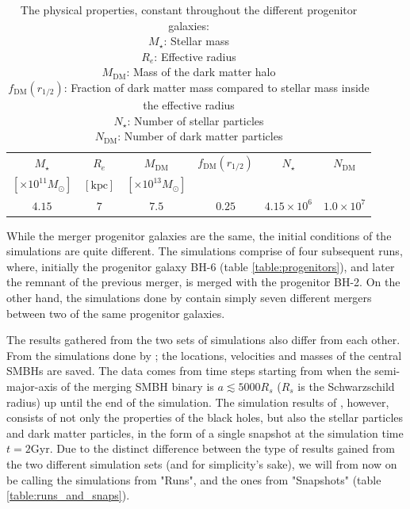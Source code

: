 \documentclass[english, oneside]{HYgradu}
\begin{document}
\begin{table}
	\begin{center}
		\begin{tabular}{c c c c c c}
		\hline
		\hline
		$M_\star$ & $R_e$ & $M_\mathrm{DM}$ & $f_\mathrm{DM}(r_{1/2})$ & $N_\star$ & $N_\mathrm{DM}$ \\
		$[\times 10^{11} M_\odot]$ & $[\mathrm{kpc}]$ & $[\times 10^{13} M_\odot]$ & & & \\
		\hline
		$4.15$ & $7$ & $7.5$ & $0.25$ & $4.15 \times 10^6$ & $1.0 \times 10^7$ \\
		\hline
		\end{tabular}
	\end{center}
	\caption{The physical properties, constant throughout the different progenitor galaxies: \\
	$M_\star$: Stellar mass \\
	$R_e$: Effective radius \\
	$M_\mathrm{DM}$: Mass of the dark matter halo \\
	$f_\mathrm{DM}(r_{1/2})$: Fraction of dark matter mass compared to stellar mass inside the effective radius \\
	$N_\star$: Number of stellar particles \\
	$N_\mathrm{DM}$: Number of dark matter particles}
	\label{table:properties}
\end{table}

While the merger progenitor galaxies are the same, the initial conditions of the simulations are quite different. The \cite{Mannerkoski2019} simulations comprise of four subsequent runs, where, initially the progenitor galaxy BH-6 (table \ref{table:progenitors}), and later the remnant of the previous merger, is merged with the progenitor BH-2. On the other hand, the simulations done by \cite{Rantala2018} contain simply seven different mergers between two of the same progenitor galaxies.

The results gathered from the two sets of simulations also differ from each other. From the simulations done by \cite{Mannerkoski2019}; the locations, velocities and masses of the central SMBHs are saved. The data comes from time steps starting from when the semi-major-axis of the merging SMBH binary is $a \lesssim 5000 R_s$ ($R_s$ is the Schwarzschild radius) up until the end of the simulation. The simulation results of \cite{Rantala2018}, however, consists of not only the properties of the black holes, but also the stellar particles and dark matter particles, in the form of a single snapshot at the simulation time $t = 2 \mathrm{Gyr}$. Due to the distinct difference between the type of results gained from the two different simulation sets (and for simplicity's sake), we will from now on be calling the simulations from \cite{Mannerkoski2019} "Runs", and the ones from \cite{Rantala2018} "Snapshots" (table \ref{table:runs_and_snaps}).
\end{document}

